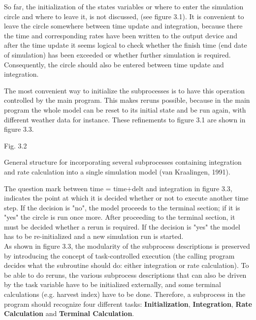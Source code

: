 \bigskip
\bigskip
\bigskip
\bigskip
\bigskip
\bigskip
\bigskip
So far, the initialization of the states variables or where to enter the simula\-tion circle and
where to leave it, is not discussed, (see figure 3.1). It is convenient to leave the circle
somewhere between time update and integration, because there the time and correspond\-ing rates have been written to the output device and after the time update it seems logical
to check whether the finish time (end date of simulation) has been exceeded or whether
further simulation is required. Consequently, the circle should also be entered between
time update and integration.

\bigskip
The most conve\-nient way to initialize the subprocesses is to have this operation controlled
by the main program. This makes reruns possible, because in the main  program the
whole model can be reset to its initial state and be run again, with different weather data
for instance. These refinements to figure 3.1 are shown in figure 3.3.

\begin{figure}[htbp]
 \begin{center} \end{center}
\end{figure}
Fig. 3.2
\testlastline

\begin{indenting}{2.54cm}
Gen\-er\-al s\-t\-ruc\-t\-ure for in\-corporating several subprocesses containing integra\-tion and rate cal\-culation into a single simulation model (van Kraalingen,
1991).
\end{indenting}

\bigskip
\bigskip
The question mark between time = time+delt and integration in figure 3.3, indicates the
point at which it is decided whether or not to execute another time step. If the decision is
"no", the model proceeds to the terminal section; if it is "yes" the circle is run once
more. After proceeding to the terminal section, it must be decided whether a rerun is
required. If the decision is "yes" the model has to be re-initialized and a new simula\-tion
run is started.\\
 As shown in figure 3.3, the modularity of the subprocess descriptions is preserved by
introducing the concept of task-controlled execution (the calling program decides what the
subroutine should do: either integration or rate calculation). To be able to do reruns, the
various subprocess descriptions that can also be driven by the task variable have to be
initialized externally, and some terminal calculations (e.g. harvest index) have to be done.
Therefore, a subprocess in the program should recognize four different tasks: {\bf Initializa\-tion}, {\bf Integration}, {\bf Rate Calcula\-tion} and {\bf Terminal Calcula\-tion}.

